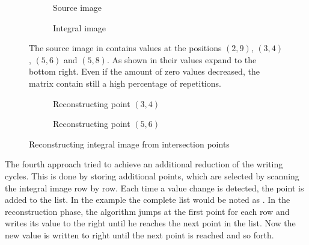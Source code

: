 \begin{figure}
\begin{subfigure}{.5\textwidth}
    
    \caption{Source image}
    \label{fig:integral_image_interference:source_image}
\end{subfigure}%
\begin{subfigure}{.5\textwidth}
    
    \caption{Integral image}
    \label{fig:integral_image_interference:integral_image}
\end{subfigure}%
\caption{The source image in  contains values at the positions $(2,9)$, $(3,4)$, $(5,6)$ and $(5,8)$. As shown in  their values expand to the bottom right. Even if the amount of zero values decreased, the matrix contain still a high percentage of repetitions.}
\label{fig:integral_image_interference}
\end{figure}

\begin{figure}
\begin{subfigure}{.5\textwidth}
    
    \caption{Reconstructing point $(3,4)$}
    \label{fig:integral_image_interference2:point1}
\end{subfigure}%
\begin{subfigure}{.5\textwidth}
    
    \caption{Reconstructing point $(5,6)$}
    \label{fig:integral_image_interference2:point2}
\end{subfigure}%
\caption{Reconstructing integral image from intersection points}
\label{fig:integral_image_interference2}
\end{figure}

The fourth approach tried to achieve an additional reduction of the writing cycles. This is done by storing additional points, which are selected by scanning the integral image row by row. Each time a value change is detected, the point is added to the list. In the example the complete list would be noted as . In the reconstruction phase, the algorithm jumps at the first point for each row and writes its value to the right until he reaches the next point in the list. Now the new value is written to right until the next point is reached and so forth.


